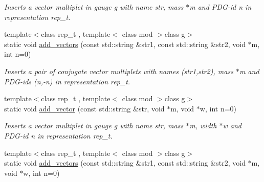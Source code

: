 \begin{DoxyCompactItemize}
\begin{DoxyCompactList}\small\item\em Inserts a vector multiplet in gauge g with name str, mass $\ast$m and P\-D\-G-\/id n in representation rep\-\_\-t. \end{DoxyCompactList}\item 
\hypertarget{a00370_a0bf317da6294eb702558bebb681d95d2}{{\footnotesize template$<$class rep\-\_\-t , template$<$ class mod $>$class g$>$ }\\static void \hyperlink{a00370_a0bf317da6294eb702558bebb681d95d2}{add\-\_\-vectors} (const std\-::string \&str1, const std\-::string \&str2, void $\ast$m, int n=0)}\label{a00370_a0bf317da6294eb702558bebb681d95d2}

\begin{DoxyCompactList}\small\item\em Inserts a pair of conjugate vector multiplets with names (str1,str2), mass $\ast$m and P\-D\-G-\/ids (n,-\/n) in representation rep\-\_\-t. \end{DoxyCompactList}\item 
\hypertarget{a00370_a13af59ef20dfa354e8603c32884fcfa4}{{\footnotesize template$<$class rep\-\_\-t , template$<$ class mod $>$class g$>$ }\\static void \hyperlink{a00370_a13af59ef20dfa354e8603c32884fcfa4}{add\-\_\-vector} (const std\-::string \&str, void $\ast$m, void $\ast$w, int n=0)}\label{a00370_a13af59ef20dfa354e8603c32884fcfa4}

\begin{DoxyCompactList}\small\item\em Inserts a vector multiplet in gauge g with name str, mass $\ast$m, width $\ast$w and P\-D\-G-\/id n in representation rep\-\_\-t. \end{DoxyCompactList}\item 
\hypertarget{a00370_a831d7e21cd47179d80ee5c56adf107d3}{{\footnotesize template$<$class rep\-\_\-t , template$<$ class mod $>$class g$>$ }\\static void \hyperlink{a00370_a831d7e21cd47179d80ee5c56adf107d3}{add\-\_\-vectors} (const std\-::string \&str1, const std\-::string \&str2, void $\ast$m, void $\ast$w, int n=0)}\label{a00370_a831d7e21cd47179d80ee5c56adf107d3}


\end{DoxyCompactItemize}
